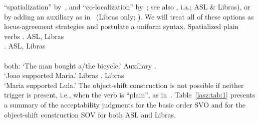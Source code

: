 \documentclass[output=paper]{langscibook}
\begin{document}
``spatialization'' by~\citealp{Quadros.etal.2004}, 
and ``co-localization'' by~\citealp{Lourenco.Wilbur.2018}; 
see also \citealp{Bergman.1980,Liddell.1980,Costello.2015,Smith.1990}, i.a.; ASL \& Libras),
or by adding an auxiliary as in~ (Libras only; \citealp{Quadros.1999}). We
will treat all of these options as locus-agreement strategies and
postulate a uniform syntax.
\ea 
    \label{lasz:ex:5}
    Spatialized plain verbs
    \ea 
          . 
        \hfill 
        \cmark ASL, \cmark Libras \\ 
        \citep[from][9]{Quadros.etal.2004}
    \ex 
          . 
        \hfill 
        \cmark ASL, \cmark Libras \\ 
        \citep[from][9]{Quadros.etal.2004} \\ 
        both: `The man bought a/the bicycle.'
    \z 
\ex 
    \label{lasz:ex:6}
    Auxiliary 
    \ea 
             . 
        \\ 
        `Joao supported Maria.'
        \citep[from][7]{Quadros.etal.2004} 
        \hfill 
        \cmark Libras 
    \ex 
            . 
        \hfill 
        \cmark Libras 
        \\ 
        `Maria supported Lula.' 
        \citep[from][5]{Quadros.etal.2004}
    \z 
\z 
The object-shift construction is not possible if neither trigger is
present, i.e., when the verb is ``plain'', as in~.
\ea 
    \label{lasz:ex:7}
    \z 
\z 
Table~\ref{lasz:tab:1} presents a summary of the acceptability judgments for the
basic order SVO and for the object-shift construction SOV for both
ASL and Libras.
\end{document}
